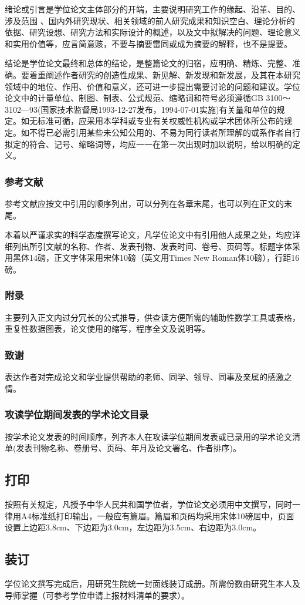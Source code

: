 绪论或引言是学位论文主体部分的开端，主要说明研究工作的缘起、沿革、目的、涉及范围 、国内外研究现状、相关领域的前人研究成果和知识空白、理论分析的依据、研究设想、研究方法和实际设计的概述，以及文中拟解决的问题、理论意义和实用价值等，应言简意赅，不要与摘要雷同或成为摘要的解释，也不是提要。

结论是学位论文最终和总体的结论，是整篇论文的归宿，应明确、精炼、完整、准确。要着重阐述作者研究的创造性成果、新见解、新发现和新发展，及其在本研究领域中的地位、作用、价值和意义，还可进一步提出需要讨论的问题和建议。学位论文中的计量单位、制图、制表、公式规范、缩略词和符号必须遵循GB 3100～3102—93(国家技术监督局1993-12-27发布，1994-07-01实施)有关量和单位的规定。如无标准可循，应采用本学科或专业有关权威性机构或学术团体所公布的规定。如不得已必需引用某些未公知公用的、不易为同行读者所理解的或系作者自行拟定的符合、记号、缩略词等，均应一一在第一次出现时加以说明，给以明确的定义。

\subsubsection{参考文献}

参考文献应按文中引用的顺序列出，可以分列在各章末尾，也可以列在正文的末尾。

本着以严谨求实的科学态度撰写论文，凡学位论文中有引用他人成果之处，均应详细列出所引文献的名称、作者、发表刊物、发表时间、卷号、页码等。标题字体采用黑体14磅，正文字体采用宋体10磅（英文用Times New Roman体10磅），行距16磅。

\subsubsection{附录}
主要列入正文内过分冗长的公式推导，供查读方便所需的辅助性数学工具或表格，重复性数据图表，论文使用的缩写，程序全文及说明等。

\subsubsection{致谢}

表达作者对完成论文和学业提供帮助的老师、同学、领导、同事及亲属的感激之情。

\subsubsection{攻读学位期间发表的学术论文目录}

按学术论文发表的时间顺序，列齐本人在攻读学位期间发表或已录用的学术论文清单(发表刊物名称、卷册号、页码、年月及论文署名、作者排序)。

\subsection{打印}

按照有关规定，凡授予中华人民共和国学位者，学位论文必须用中文撰写，同时一律用A4标准纸打印输出，一般应有篇眉。篇眉和页码均采用宋体10磅居中，页面设置上边距3.8cm、下边距为3.0cm，左边距为3.5cm、右边距为3.0cm。

\subsection{装订}

学位论文撰写完成后，用研究生院统一封面线装订成册。所需份数由研究生本人及导师掌握（可参考学位申请上报材料清单的要求）。
\fi